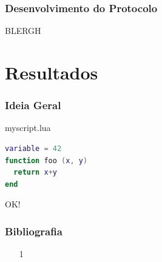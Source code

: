 \documentclass[brazil]{beamer}
\begin{document}
\begin{frame}
  \frametitle{Desenvolvimento do Protocolo}
  
  BLERGH
\end{frame}
\section{Resultados}
\begin{frame}[fragile]
  \frametitle{Ideia Geral}
  \pause
  \begin{block}{myscript.lua}
    \begin{lstlisting}[language=lua]
variable = 42
function foo (x, y)
  return x+y
end
    \end{lstlisting}
  \end{block}
\end{frame}
\begin{frame}
  \begin{center}
    \LARGE OK!
  \end{center}
\end{frame}
\begin{frame}
  \frametitle{Bibliografia}
  \begin{itemize}
    \footnotesize
    \item[1]
    \vspace{1em}
  \end{itemize}
\end{frame}
\end{document}
